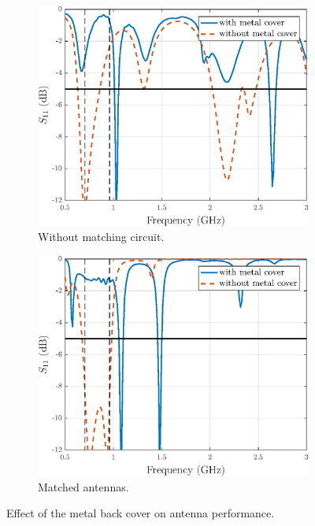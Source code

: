 \begin{figure}[H]
    \centering 
    \begin{subfigure}[b]{0.49\textwidth}
        \includegraphics[width=\textwidth]{img/metal_vs_nometal.eps}
        \caption{Without matching circuit.}
        \label{fig:metal_vs_nometal}
    \end{subfigure}
    \begin{subfigure}[b]{0.49\textwidth}
        \includegraphics[width=\textwidth]{img/metal_vs_nometal_matched.eps}
        \caption{Matched antennas.}
        \label{fig:metal_vs_nometal_matched}
    \end{subfigure}
    \caption{Effect of the metal back cover on antenna performance.}
    \label{fig:metal_vs_nometal_results}
\end{figure}



